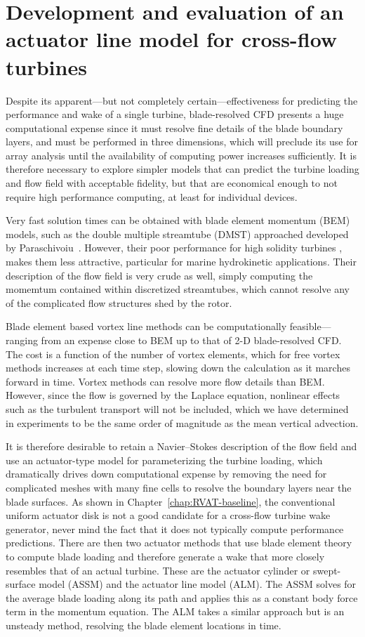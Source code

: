 \chapter{Development and evaluation of an actuator line model for cross-flow
    turbines}\label{chap:ALM}

Despite its apparent---but not completely certain---effectiveness for predicting
the performance and wake of a single turbine, blade-resolved CFD presents a huge
computational expense since it must resolve fine details of the blade boundary
layers, and must be performed in three dimensions, which will preclude its use
for array analysis until the availability of computing power increases
sufficiently. It is therefore necessary to explore simpler models that can
predict the turbine loading and flow field with acceptable fidelity, but that
are economical enough to not require high performance computing, at least for
individual devices.

Very fast solution times can be obtained with blade element momentum (BEM)
models, such as the double multiple streamtube (DMST) approached developed by
Paraschivoiu~\cite{Para1988}. However, their poor performance for high solidity
turbines \cite{Joo2015}, makes them less attractive, particular for marine
hydrokinetic applications. Their description of the flow field is very crude as
well, simply computing the momemtum contained within discretized streamtubes,
which cannot resolve any of the complicated flow structures shed by the rotor.

Blade element based vortex line methods can be computationally
feasible---ranging from an expense close to BEM up to that of 2-D blade-resolved
CFD. The cost is a function of the number of vortex elements, which for free
vortex methods increases at each time step, slowing down the calculation as it
marches forward in time. Vortex methods can resolve more flow details than BEM.
However, since the flow is governed by the Laplace equation, nonlinear effects
such as the turbulent transport will not be included, which we have determined
in experiments to be the same order of magnitude as the mean vertical advection.

It is therefore desirable to retain a Navier--Stokes description of the flow
field and use an actuator-type model for parameterizing the turbine loading,
which dramatically drives down computational expense by removing the need for
complicated meshes with many fine cells to resolve the boundary layers near the
blade surfaces. As shown in Chapter~\ref{chap:RVAT-baseline}, the conventional
uniform actuator disk is not a good candidate for a cross-flow turbine wake
generator, never mind the fact that it does not typically compute performance
predictions. There are then two actuator methods that use blade element theory
to compute blade loading and therefore generate a wake that more closely
resembles that of an actual turbine. These are the actuator cylinder or
swept-surface model (ASSM) and the actuator line model (ALM). The ASSM solves
for the average blade loading along its path and applies this as a constant body
force term in the momentum equation. The ALM takes a similar approach but is an
unsteady method, resolving the blade element locations in time.

